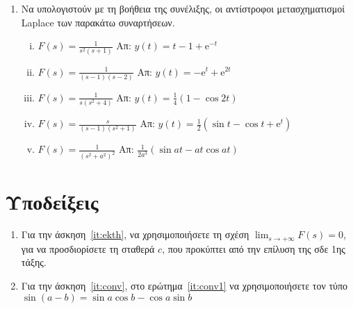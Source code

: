 \begin{enumerate}
  \item\label{it:conv} 
    Να υπολογιστούν με τη βοήθεια της συνέλιξης, οι αντίστροφοι μετασχηματισμοί 
    Laplace των παρακάτω συναρτήσεων.
    \begin{enumerate}[i)]
      \item $ F(s) = \frac{1}{s^{2}(s+1)} $ \hfill Απ: $ y(t) = t-1+ \mathrm{e}^{-t} $ 
      \item $ F(s) = \frac{1}{(s-1)(s-2)} $ \hfill Απ: $ y(t) = - \mathrm{e}^{t} +
        \mathrm{e}^{2t} $ 
      \item $ F(s) = \frac{1}{s(s^{2}+4)} $ \hfill Απ: $ y(t) = \frac{1}{4} (1-
        \cos{2t}) $ 
      \item $ F(s) = \frac{s}{(s-1)(s^{2}+1)} $ \hfill Απ: $ y(t) = \frac{1}{2}
        (\sin{t} - \cos{t} + \mathrm{e}^{t}) $  
      \item\label{it:conv1} 
        $ F(s) = \frac{1}{(s^{2}+a^{2})^{2}} $ \hfill Απ: $ \frac{1}{2a^{3}} 
        (\sin{at} - at \cos{at}) $ 
    \end{enumerate}

\end{enumerate}

\vspace{\baselineskip}

\section*{Υποδείξεις}

  \begin{enumerate}
    \item Για την άσκηση~\ref{it:ekth}, να χρησιμοποιήσετε τη σχέση
      $ \lim\nolimits_{s\to+\infty}F(s)=0 $, για να προσδιορίσετε τη σταθερά $c$, που 
      προκύπτει από την επίλυση της σδε 1ης τάξης.
    \item Για την άσκηση~\ref{it:conv}, στο ερώτημα~\ref{it:conv1} να χρησιμοποιήσετε
      τον τύπο $ \sin{(a-b)} = \sin{a} \cos{b} - \cos{a} \sin{b} $ 
  \end{enumerate}



